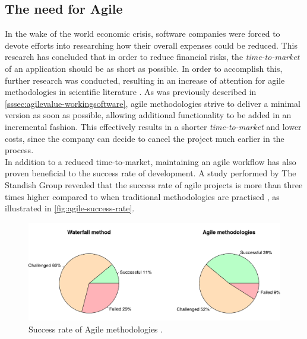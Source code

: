 
\subsection{The need for Agile}
In the wake of the world economic crisis, software companies were forced to devote efforts into researching how their overall expenses could be reduced. This research has concluded that in order to reduce financial risks, the \emph{time-to-market} of an application should be as short as possible. In order to accomplish this, further research was conducted, resulting in an increase of attention for agile methodologies in scientific literature \cite{ionel2009}. As was previously described in \autoref{sssec:agilevalue-workingsoftware}, agile methodologies strive to deliver a minimal version as soon as possible, allowing additional functionality to be added in an incremental fashion. This effectively results in a shorter \emph{time-to-market} and lower costs, since the company can decide to cancel the project much earlier in the process.\\

\noindent In addition to a reduced time-to-market, maintaining an agile workflow has also proven beneficial to the success rate of development. A study performed by The Standish Group revealed that the success rate of agile projects is more than three times higher compared to when traditional methodologies are practised \cite[p.~7]{standish2015chaos}, as illustrated in \autoref{fig:agile-success-rate}. 

\begin{figure}[htbp!]
	\centering
	\includegraphics[width=\textwidth]{assets/agile-success-rate.pdf}
	\caption{Success rate of Agile methodologies \cite{standish2015chaos}.}
	\label{fig:agile-success-rate}
\end{figure}




